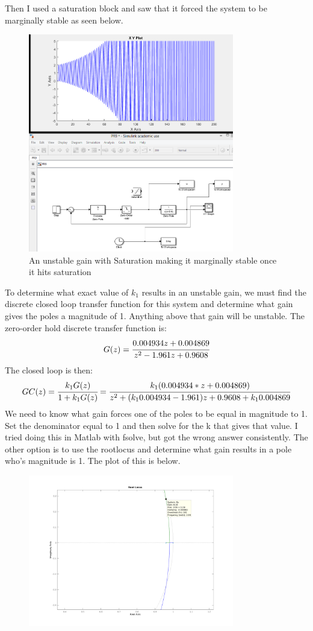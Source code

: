 \documentclass{article}
\begin{document}
Then I used a saturation block and saw that it forced the system to be marginally stable as seen below.
\begin{figure}[H]
    \centering
    \includegraphics[width=0.8\textwidth]{unstable_nosat.png}
    \caption{An unstable gain with Saturation making it marginally stable once it hits saturation}
\end{figure}
To determine what exact value of $k_1$ results in an unstable gain, we must find the discrete closed loop transfer function for this system and determine what gain gives the poles a magnitude of 1. Anything above that gain will be unstable. The zero-order hold discrete transfer function is:
\[G(z)=\cfrac{0.004934z+0.004869}{z^2-1.961z+0.9608}\]
The closed loop is then:
\[GC(z)=\cfrac{k_1G(z)}{1+k_1G(z)}=\cfrac{k_1(0.004934*z+0.004869)}{z^2+(k_10.004934-1.961)z+0.9608+k_10.004869}\]
We need to know what gain forces one of the poles to be equal in magnitude to 1. Set the denominator equal to 1 and then solve for the k that gives that value. I tried doing this in Matlab with fsolve, but got the wrong answer consistently. The other option is to use the rootlocus and determine what gain results in a pole who's magnitude is 1. The plot of this is below.
\begin{figure}[H]
    \centering
    \includegraphics[width=0.8\textwidth]{rlocus.png}
\end{figure}
\end{document}
